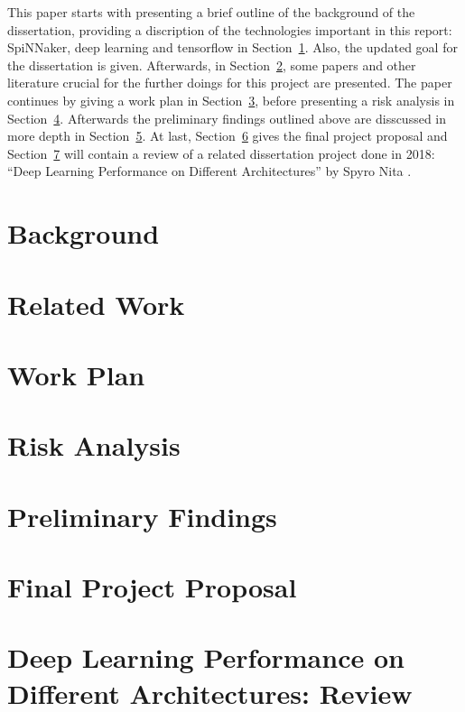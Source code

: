 \documentclass{article}
\begin{document}
This paper starts with presenting a brief outline of the
background of the dissertation, providing a discription of
the technologies important in this report: SpiNNaker, deep
learning and tensorflow in Section~\ref{sec:background}.
Also, the updated goal for the dissertation is given.
Afterwards, in Section~\ref{sec:related_work}, some
papers and other literature crucial for the further doings
for this project are presented.
The paper continues by giving a work plan in
Section~\ref{sec:work_plan}, before presenting a risk
analysis in Section~\ref{sec:risk_analysis}.
Afterwards the preliminary findings outlined above are
disscussed in more depth in Section~\ref{sec:prelim}.
At last, Section~\ref{sec:proposal} gives the final
project proposal and Section~\ref{sec:review} will contain
a review of a related dissertation project done in 2018:
``Deep Learning Performance on Different Architectures'' by
Spyro Nita \citep{nita_2018}.


\section{Background} %
\label{sec:background}


\section{Related Work} %
\label{sec:related_work}


\section{Work Plan} %
\label{sec:work_plan}


\section{Risk Analysis} %
\label{sec:risk_analysis}


\section{Preliminary Findings} %
\label{sec:prelim}


\section{Final Project Proposal} %
\label{sec:proposal}


\section{Deep Learning Performance on Different %
  Architectures: Review}
\label{sec:review}



\end{document}
